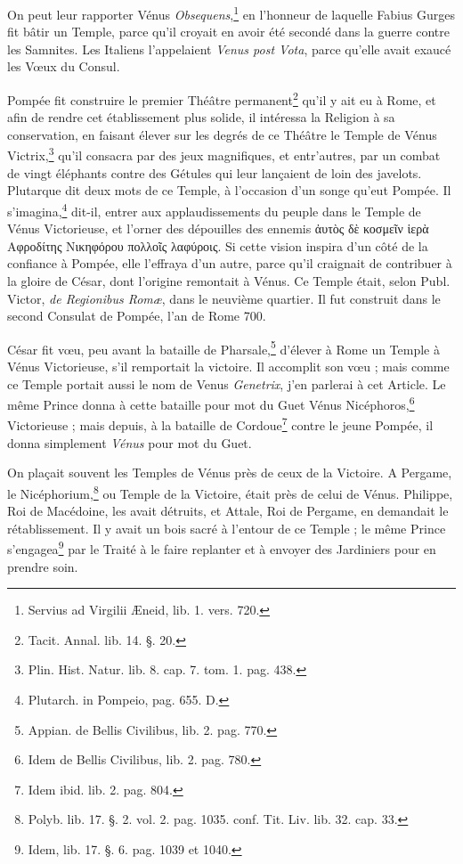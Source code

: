 \documentclass[a4paper, 11pt, oneside, polutonikogreek, french]{article}
\begin{document}
On peut leur rapporter Vénus \emph{Obsequens},\footnote{Servius ad Virgilii Æneid, lib. 1. vers. 720.} en l'honneur de laquelle Fabius Gurges fit bâtir un Temple, parce qu'il croyait en avoir été secondé dans la guerre contre les Samnites. Les Italiens l'appelaient \emph{Venus post Vota}, parce qu'elle avait exaucé les Vœux du Consul.

Pompée fit construire le premier Théâtre permanent\footnote{Tacit. Annal. lib. 14. §. 20.} qu'il y ait eu à Rome, et afin de rendre cet établissement plus solide, il intéressa la Religion à sa conservation, en faisant élever sur les degrés de ce Théâtre le Temple de Vénus Victrix,\footnote{Plin. Hist. Natur. lib. 8. cap. 7. tom. 1. pag. 438.} qu'il consacra par des jeux magnifiques, et entr'autres, par un combat de vingt éléphants contre des Gétules qui leur lançaient de loin des javelots. Plutarque dit deux mots de ce Temple, à l'occasion d'un songe qu'eut Pompée. Il s'imagina,\footnote{Plutarch. in Pompeio, pag. 655. D.} dit-il, entrer aux applaudissements du peuple dans le Temple de Vénus Victorieuse, et l'orner des dépouilles des ennemis ἀυτὸς δὲ κοσμεῖν ἱερὰ Αφροδίτης Νικηφόρου πολλοῖς λαφύροις. Si cette vision inspira d'un côté de la confiance à Pompée, elle l'effraya d'un autre, parce qu'il craignait de contribuer à la gloire de César, dont l'origine remontait à Vénus. Ce Temple était, selon Publ. Victor, \emph{de Regionibus Romæ}, dans le neuvième quartier. Il fut construit dans le second Consulat de Pompée, l'an de Rome 700.

César fit vœu, peu avant la bataille de Pharsale,\footnote{Appian. de Bellis Civilibus, lib. 2. pag. 770.} d'élever à Rome un Temple à Vénus Victorieuse, s'il remportait la victoire. Il accomplit son vœu ; mais comme ce Temple portait aussi le nom de Venus \emph{Genetrix}, j'en parlerai à cet Article. Le même Prince donna à cette bataille pour mot du Guet Vénus Nicéphoros,\footnote{Idem de Bellis Civilibus, lib. 2. pag. 780.} Victorieuse ; mais depuis, à la bataille de Cordoue\footnote{Idem ibid. lib. 2. pag. 804.} contre le jeune Pompée, il donna simplement \emph{Vénus} pour mot du Guet.

On plaçait souvent les Temples de Vénus près de ceux de la Victoire. A Pergame, le Nicéphorium,\footnote{Polyb. lib. 17. §. 2. vol. 2. pag. 1035. conf. Tit. Liv. lib. 32. cap. 33.} ou Temple de la Victoire, était près de celui de Vénus. Philippe, Roi de Macédoine, les avait détruits, et Attale, Roi de Pergame, en demandait le rétablissement. Il y avait un bois sacré à l'entour de ce Temple ; le même Prince s'engagea\footnote{Idem, lib. 17. §. 6. pag. 1039 et 1040.} par le Traité à le faire replanter et à envoyer des Jardiniers pour en prendre soin.
\end{document}
